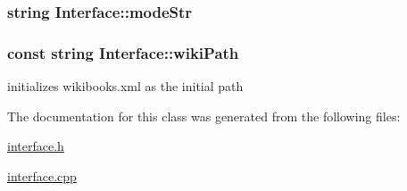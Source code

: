 \subsubsection[{mode\+Str}]{\setlength{\rightskip}{0pt plus 5cm}string Interface\+::mode\+Str\hspace{0.3cm}{\ttfamily [private]}}\label{class_interface_a1898f75ce60e62537678004d2dd5b627}
\hypertarget{class_interface_a2dca5f7e2ddb5d7bf82c9eaf8f3a17eb}{}
\subsubsection[{wiki\+Path}]{\setlength{\rightskip}{0pt plus 5cm}const string Interface\+::wiki\+Path\hspace{0.3cm}{\ttfamily [private]}}\label{class_interface_a2dca5f7e2ddb5d7bf82c9eaf8f3a17eb}


initializes wikibooks.\+xml as the initial path 



The documentation for this class was generated from the following files\+:\begin{DoxyCompactItemize}
\item 
\hyperlink{interface_8h}{interface.\+h}\item 
\hyperlink{interface_8cpp}{interface.\+cpp}\end{DoxyCompactItemize}
